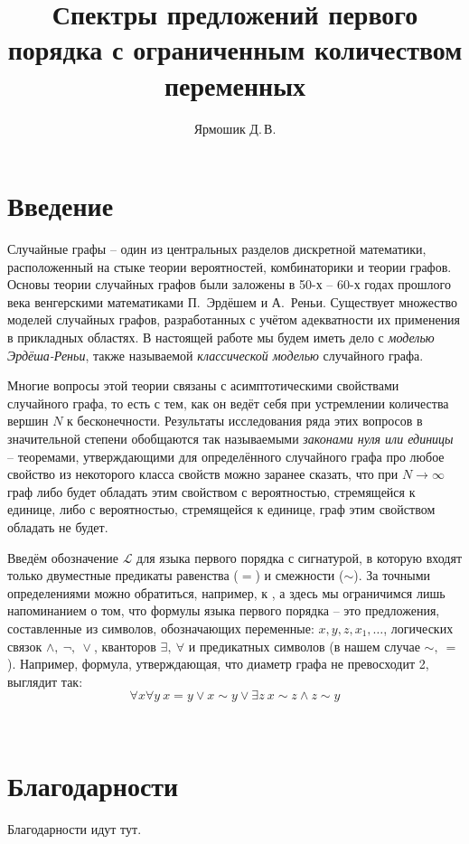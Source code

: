 \documentclass{mipt-thesis-bs}
\title{Спектры предложений первого порядка с ограниченным количеством переменных}
\author{Ярмошик Д.\,В.}
\begin{document}
    \frontmatter
    \titlecontents

    \mainmatter


    \chapter{Введение}
    Случайные графы -- один из центральных разделов дискретной математики, расположенный на стыке теории вероятностей, комбинаторики и теории графов.
    Основы теории случайных графов были заложены в 50-х -- 60-х годах прошлого века венгерскими математиками П.~Эрдёшем и А.~Реньи.
    Существует множество моделей случайных графов, разработанных с учётом адекватности их применения в прикладных областях.
    В настоящей работе мы будем иметь дело с \textit{моделью Эрдёша-Реньи}, также называемой \textit{классической моделью} случайного графа.
    
    Многие вопросы этой теории связаны с асимптотическими свойствами случайного графа, то есть с тем, как он ведёт себя при устремлении количества вершин $N$ к бесконечности.
    Результаты исследования ряда этих вопросов в значительной степени обобщаются так называемыми \textit{законами нуля или единицы} -- теоремами, утверждающими для определённого случайного графа про любое свойство из некоторого класса свойств можно заранее сказать, что при $N \rightarrow \infty$ граф либо будет обладать этим свойством с вероятностью, стремящейся к единице, либо с вероятностью, стремящейся к единице, граф этим свойством обладать не будет.
    
    Введём обозначение $\mathcal{L}$ для языка первого порядка с сигнатурой, в которую входят только двуместные предикаты равенства ($=$) и смежности ($\sim$).
    За точными определениями можно обратиться, например, к
    \cite{shen}, а здесь мы ограничимся лишь напоминанием о том, что формулы языка первого порядка -- это предложения, составленные из символов, обозначающих переменные: 
    $x,y,z,x_1,\ldots$, 
    логических связок 
    $\wedge, ~\neg, ~\vee$, 
    кванторов 
    $\exists, ~\forall$ и 
    предикатных символов (в нашем случае
    $\sim, ~ =$).
    Например, формула, утверждающая, что диаметр графа не превосходит 2, выглядит так:
    \[
    \forall x \forall y ~ x=y \vee x\sim y \vee \exists z ~ x \sim z \wedge z \sim y
    \]
    
    \
    
    



    \backmatter
    
    

    \chapter{Благодарности}

    Благодарности идут тут.

    
\end{document}
